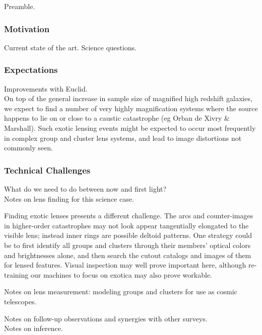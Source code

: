 \documentclass[twocolumn]{svjour3}
\begin{document}
Preamble.

\subsubsection{Motivation}
Current state of the art. Science questions.\\

\subsubsection{Expectations}

Improvements with Euclid.\\

On top of the general increase in sample size of magnified high redshift
galaxies, we expect to find a number of very highly magnification
systems where the source happens to lie on or close to a caustic
catastrophe (eg Orban de Xivry \& Marshall). Such exotic lensing events
might be expected to occur most frequently in complex group and cluster
lens systems, and lead to image distortions not commonly seen.

\subsubsection{Technical Challenges}

What do we need to do between now and first light?\\

Notes on lens finding for this science case.

Finding exotic lenses presents a different challenge. The arcs and
counter-images in higher-order catastrophes may not look appear
tangentially elongated to the visible lens; instead inner rings are
possible deltoid patterns. One strategy could be to first identify all
groups and clusters through their members' optical colors and
brightnesses alone, and then search the cutout catalogs and images of
them for lensed features. Visual inspection may well prove important
here, although re-training our machines to focus on exotica may also
prove workable.


Notes on lens measurement: modeling groups and clusters for use as
cosmic telescopes.

Notes on follow-up observations and synergies with other surveys.\\

Notes on inference.\\


\end{document}
